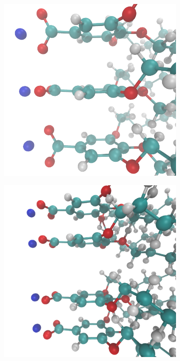 \documentclass{article}
\begin{document}
  \begin{figure}[htb]
  \centering
  \begin{subfigure}{0.3\linewidth}
  	\centering
  	\includegraphics[width=\textwidth]{rotated_carboxylate.png}
	\label{fig:rotated_carboxylate}
  \end{subfigure}
  \begin{subfigure}{0.3\linewidth}
  	\centering
  	\includegraphics[width=\textwidth]{staggered.png}

\end{subfigure}
\end{figure}
\end{document}
